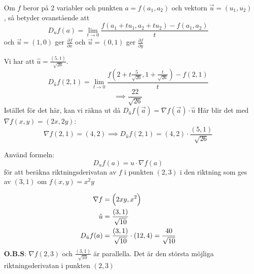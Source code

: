 \documentclass{report}
\begin{document}
\ex{}
{
Om $ f $ beror på 2 variabler och punkten $ a = f(a_1, a_2) $ och vektorn $ \vec{u} = (u_1, u_2) $, så betyder ovanstående att
\begin{equation*}
D_uf(a) = \lim_{t \to 0} \frac{f(a_1+tu_1, a_2+tu_2)-f(a_1,a_2)}{t} 
\end{equation*}
och $ \vec{u} = (1,0) $ ger $ \frac{\partial f }{\partial x }  $ och $ \vec{u} = (0,1) $ ger $ \frac{\partial f }{\partial y }  $ 
}

{
	Vi har att $ \hat{u} = \frac{(5,1)}{ \sqrt{26} }  $.
\begin{equation*}
	D_{\hat{u}} f(2,1) = \lim_{t \to 0} \frac{f(2 + t \frac{5}{ \sqrt{26} }, 1 + \frac{t}{ \sqrt{26} } ) - f(2,1)}{t}
\end{equation*}
\begin{equation*}
\implies \frac{22}{ \sqrt{26} } 
\end{equation*}
Istället för det här, kan vi räkna ut då $ D_{\hat{u}} f( \vec{a} ) = \nabla f( \vec{a} ) \cdot \hat{u} $ 
Här blir det med $ \nabla f(x,y) = (2x,2y) $:
\begin{equation*}
	\nabla f(2,1) = (4,2) \implies D_{\hat{u}} f(2,1) = (4,2) \cdot \frac{(5,1)}{ \sqrt{26} } 
\end{equation*}
}


\qs{}
{
Använd formeln:
\begin{equation*}
D_uf(a) = u \cdot \nabla f(a)
\end{equation*}
för att beräkna riktningsderivatan av $ f $ i punkten $ (2,3) $ i den riktning som ges av $ (3,1) $ om $ f(x,y) = x^2y $  
}

\sol 
\begin{align*}
	\nabla f &= \Bigl( 2xy, x^2  \Bigr)\\
	\hat{u} &= \frac{(3,1)}{ \sqrt{10} }\\
	D_{\hat{u}}f(a) &= \frac{(3,1)}{ \sqrt{10} }  \cdot (12, 4) = 
\frac{40}{ \sqrt{10} } 
\end{align*}
\noindent
\textbf{O.B.S}: $ \nabla f(2,3) $ och $ \frac{(3,1)}{ \sqrt{10} }  $ är parallella. Det är den största möjliga riktningsderivatan i punkten $ (2,3) $ 
\end{document}
